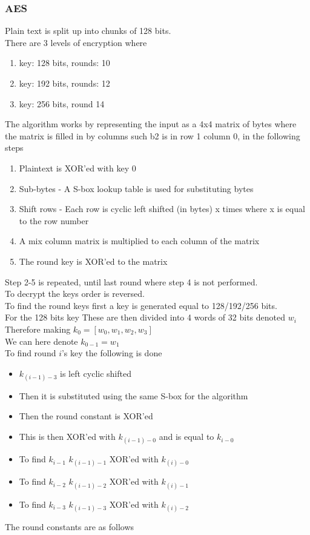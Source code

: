 \documentclass[12pt, a4paper]{article}
\begin{document}
			\subsubsection{AES}
				Plain text is split up into chunks of 128 bits.\\
				There are 3 levels of encryption where 
				\begin{enumerate}
					\item key: 128 bits, rounds: 10
					\item key: 192 bits, rounds: 12
					\item key: 256 bits, round 14
				\end{enumerate}
				The algorithm works by representing the input as a 4x4 matrix of bytes where the matrix is filled in by columns such b2 is in row 1 column 0, in the following steps
				\begin{enumerate}
					\item Plaintext is XOR'ed with key 0
					\item Sub-bytes - A S-box lookup table is used for substituting bytes
					\item Shift rows - Each row is cyclic left shifted (in bytes) x times where x is equal to the row number 
					\item A mix column matrix is multiplied to each column of the matrix
					\item The round key is XOR'ed to the matrix
				\end{enumerate}
				Step 2-5 is repeated, until last round where step 4 is not performed.\\
				To decrypt the keys order is reversed.\\[4mm]
				To find the round keys first a key is generated equal to 128/192/256 bits.\\
				For the 128 bits key
				These are then divided into 4 words of 32 bits denoted $w_i$\\
				Therefore making $k_0=[w_0,w_1,w_2,w_3]$\\
				We can here denote $k_{0-1}=w_1$\\
				To find round $i$'s key the following is done
				\begin{itemize}
					\item $k_{(i-1) - 3}$ is left cyclic shifted
					\item Then it is substituted using the same S-box for the algorithm
					\item Then the round constant is XOR'ed
					\item This is then XOR'ed with $k_{(i-1)-0}$ and is equal to $k_{i-0}$
					\item To find $k_{i-1}$ $k_{(i-1)-1}$ XOR'ed with $k_{(i)-0}$ 
					\item To find $k_{i-2}$ $k_{(i-1)-2}$ XOR'ed with $k_{(i)-1}$ 
					\item To find $k_{i-3}$ $k_{(i-1)-3}$ XOR'ed with $k_{(i)-2}$ 
				\end{itemize}
				The round constants are as follows
\end{document}

